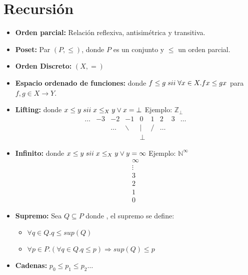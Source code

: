 \section{Recursión}
  \begin{itemize}
    \item \textbf{Orden parcial:} Relación reflexiva, antisimétrica y transitiva.
    \item \textbf{Poset:} Par $(P, \leq)$, donde $P$ es un conjunto y $\leq$ un orden parcial.
    \item \textbf{Orden Discreto:} $(X, =)$
    \item \textbf{Espacio ordenado de funciones:}  \entonces {} donde $f \leq g \; sii \; \forall x \in X. f x \leq g x$ para $f, g \in X \rightarrow Y$.
    \item \textbf{Lifting:}  \entonces {} donde $x \leq y \; sii \; x \leq_{X} y \vee x = \bot$
      \PN Ejemplo: $\mathbb{Z}_{\bot}$
      \[
        \begin{array}{crrrclccc}
            \ldots & -3 & -2 & -1& 0 &1& 2& 3& \ldots \\
                        &      &  \ldots  &  \backslash   &  | & / & \ldots \\
                        &     &      &     & \perp
        \end{array}
      \]
    \item \textbf{Infinito:}  \entonces {} donde $x \leq y \; sii \; x \leq_{X} y \vee y = \infty$
      \PN Ejemplo: $\mathbb{N}^{\infty}$
      \[
        \begin{array}{c}
        \infty \\
          \vdots \\
          3 \\
          2 \\
          1 \\
          0
        \end{array}
      \]
    \item \textbf{Supremo:} Sea $Q \subseteq P$ donde , el supremo se define:
      \begin{itemize}
        \item $\forall q \in Q. q \leq sup(Q)$
        \item $\forall p \in P.(\forall q \in Q. q \leq p) \Rightarrow sup(Q) \leq p$
      \end{itemize}
    \item \textbf{Cadenas:} $p_0 \leq p_1 \leq p_2 \dotsc$

\end{itemize}
